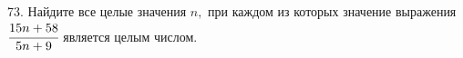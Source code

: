 73. Найдите все целые значения $n,$ при каждом из которых значение выражения $\cfrac{15n+58}{5n+9}$ является целым числом.\\
